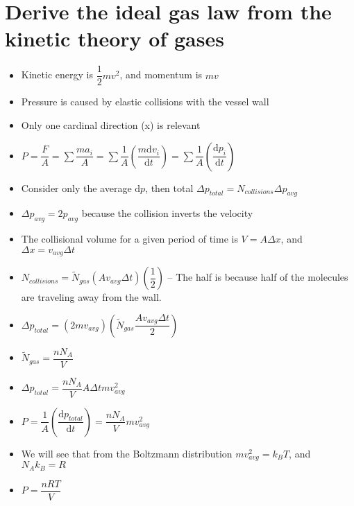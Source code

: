 \documentclass[12pt, openany, letterpaper]{memoir}
\begin{document}
\section*{Derive the ideal gas law from the kinetic theory of gases}
\begin{itemize}
	\item Kinetic energy is $\dfrac{1}{2}mv^2$, and momentum is $mv$
	\item Pressure is caused by elastic collisions with the vessel wall
	\item Only one cardinal direction (x) is relevant
	\item $P=\dfrac{F}{A} = \sum\dfrac{ma_i}{A} = \sum\dfrac{1}{A}\left(\dfrac{m\mathrm{d}v_i}{\mathrm{d}t}\right) = \sum\dfrac{1}{A}\left(\dfrac{\mathrm{d}p_i}{\mathrm{d}t}\right)$
	\item Consider only the average $\mathrm{d}p$, then total $\Delta p_{total} = N_{collisions}\Delta p_{avg}$
	\item $\Delta p_{avg} = 2p_{avg}$ because the collision inverts the velocity
	\item The collisional volume for a given period of time is $V = A\Delta x$, and $\Delta x =  v_{avg}\Delta t$
	\item $N_{collisions} = \tilde{N}_{gas}\left(Av_{avg}\Delta t\right)\left(\dfrac{1}{2}\right)$ -- The half is because half of the molecules are traveling away from the wall.
	\item $\Delta p_{total} = \left(2mv_{avg}\right)\left(\tilde{N}_{gas}\dfrac{Av_{avg}\Delta t}{2}\right)$
	\item $\tilde{N}_{gas} = \dfrac{nN_A}{V}$
	\item $\Delta p_{total} = \dfrac{nN_A}{V}A\Delta t m v_{avg}^2$
	\item $P = \dfrac{1}{A}\left(\dfrac{\mathrm{d}p_{total}}{\mathrm{d}t}\right) = \dfrac{nN_A}{V}mv_{avg}^2$
	\item We will see that from the Boltzmann distribution $mv_{avg}^2 = k_BT$, and $N_Ak_B=R$
	\item $P = \dfrac{nRT}{V}$
\end{itemize}
\end{document}
